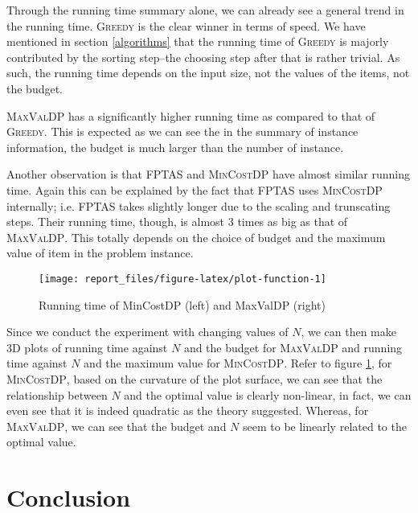 \documentclass[12pt, oneside]{book}
\begin{document}
Through the running time summary alone, we can already see a general
trend in the running time. \textsc{Greedy} is the clear winner in terms
of speed. We have mentioned in section \ref{algorithms} that the running
time of \textsc{Greedy} is majorly contributed by the sorting step--the
choosing step after that is rather trivial. As such, the running time
depends on the input size, not the values of the items, not the budget.

\textsc{MaxValDP} has a significantly higher running time as compared to
that of \textsc{Greedy}. This is expected as we can see the in the
summary of instance information, the budget is much larger than the
number of instance.

Another observation is that \textsc{FPTAS} and \textsc{MinCostDP} have
almost similar running time. Again this can be explained by the fact
that \textsc{FPTAS} uses \textsc{MinCostDP} internally; i.e.
\textsc{FPTAS} takes slightly longer due to the scaling and trunscating
steps. Their running time, though, is almost 3 times as big as that of
\textsc{MaxValDP}. This totally depends on the choice of budget and the
maximum value of item in the problem instance.

\begin{figure}

{\centering \texttt{[image: report\_files/figure-latex/plot-function-1]} 

}

\caption{Running time of MinCostDP (left) and MaxValDP (right)}\label{fig:plot-function}
\end{figure}

Since we conduct the experiment with changing values of \(N\), we can
then make 3D plots of running time against \(N\) and the budget for
\textsc{MaxValDP} and running time against \(N\) and the maximum value
for \textsc{MinCostDP}. Refer to figure \ref{fig:plot-function}, for
\textsc{MinCostDP}, based on the curvature of the plot surface, we can
see that the relationship between \(N\) and the optimal value is clearly
non-linear, in fact, we can even see that it is indeed quadratic as the
theory suggested. Whereas, for \textsc{MaxValDP}, we can see that the
budget and \(N\) seem to be linearly related to the optimal value.

\chapter{Conclusion}\label{conclusion}
\end{document}
